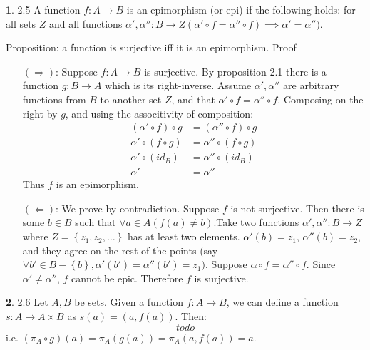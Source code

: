 \documentclass{article}
\theoremstyle{definition}
\newcommand{\set}[1]{\left\{#1\right\}}
\theoremstyle{definition}
\theoremstyle{definition}
\newtheorem{solution-internal}{}[subsection]
\newenvironment{solution}{
  \medskip
  \begin{solution-internal}
}{
  \end{solution-internal}
}
\begin{document}
\begin{solution}
2.5 A function $f\colon A \to B$ is an epimorphism (or epi) if the following holds:
for all sets $Z$ and all functions $\alpha', \alpha''\colon B \to Z (\alpha' \circ f = \alpha'' \circ f) \implies \alpha' = \alpha'')$.

Proposition: a function is surjective iff it is an epimorphism.
Proof
\begin{itemize}
\item[$(\Rightarrow)$:] Suppose $f\colon A \to B$ is surjective. By proposition 2.1 there is a function $g\colon B \to A$ which is its right-inverse. Assume $\alpha',\alpha''$ are arbitrary functions from $B$ to another set $Z$, and that $\alpha' \circ f = \alpha'' \circ f$.
Composing on the right by $g$, and using the associtivity of composition:
\begin{align*}
(\alpha' \circ f)\circ g &= (\alpha''\circ f)\circ g \\
\alpha' \circ (f\circ g) &= \alpha''\circ (f\circ g) \\
\alpha' \circ (id_B) &= \alpha''\circ (id_B) \\
\alpha' &= \alpha''
\end{align*}
Thus $f$ is an epimorphism.
\item[$(\Leftarrow)$:] We prove by contradiction. Suppose $f$ is not
surjective. Then there is some $b \in B$ such that $\forall a \in A (f(a) \neq
b)$.Take two functions $\alpha', \alpha''\colon B \to Z$ where $Z =
\set{z_1,z_2,\dots}$ has at least two elements. $\alpha'(b) = z_1$,
$\alpha''(b) = z_2$, and they agree on the rest of the points (say $\forall b' \in B - \set{b}, \alpha'(b') = \alpha''(b') = z_1)$.
Suppose $\alpha \circ f = \alpha'' \circ f$. Since $\alpha' \neq \alpha''$, $f$
cannot be epic. Therefore $f$ is surjective.
\end{itemize}
\end{solution}

\begin{solution}
2.6 Let $A, B$ be sets. Given a function $f\colon A\to B$, we can define a function $s\colon A \to A \times B$ as $s(a) = (a, f(a))$. Then:
\[ todo \]
i.e. $(\pi_A \circ g)(a) = \pi_A(g(a)) = \pi_A(a, f(a)) = a$.
\end{solution}
\end{document}
